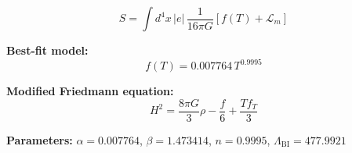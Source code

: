 
\begin{equation}
  S = \int d^4x \, |e| \, \frac{1}{16\pi G} \left[ f(T) + \mathcal{L}_m \right]
\end{equation}

\textbf{Best-fit model:}
\begin{equation}
  f(T) = 0.007764 \, T^{0.9995}
\end{equation}

\textbf{Modified Friedmann equation:}
\begin{equation}
  H^2 = \frac{8\pi G}{3} \rho - \frac{f}{6} + \frac{T f_T}{3}
\end{equation}

\textbf{Parameters:}
$\alpha = 0.007764$, \quad
$\beta = 1.473414$, \quad
$n = 0.9995$, \quad
$\Lambda_{\text{BI}} = 477.9921$
